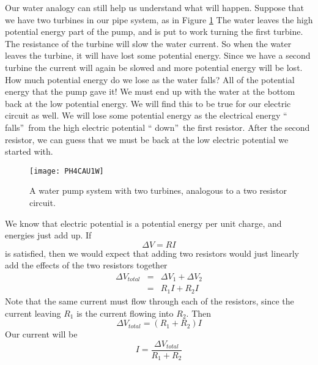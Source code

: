 Our water analogy can still help us understand what will happen. Suppose
that we have two turbines in our pipe system, as in Figure
\ref{fig:water_pump_analogy_2}
The water leaves the high
potential energy part of the pump, and is put to work turning the first
turbine. The resistance of the turbine will slow the water current. So when
the water leaves the turbine, it will have lost some potential energy. Since
we have a second turbine the current will again be slowed and more potential
energy will be lost. How much potential energy do we lose as the water
falls? All of the potential energy that the pump gave it! We must end up
with the water at the bottom back at the low potential energy. We will find
this to be true for our electric circuit as well. We will lose some
potential energy as the electrical energy \textquotedblleft
falls\textquotedblright\ from the high electric potential \textquotedblleft
down\textquotedblright\ the first resistor. After the second resistor, we
can guess that we must be back at the low electric potential we started with.
\begin{figure}[htbp!]
\centering
\texttt{[image: PH4CAU1W]}
\caption[A water pump system with two turbines]{A water pump system
with two turbines, analogous to a two resistor circuit.}
\label{fig:water_pump_analogy_2}
\end{figure}

We know that electric potential
is a potential energy per unit charge, and energies just add up. If 
\begin{equation*}
\Delta V=RI
\end{equation*}%
is satisfied, then we would expect that adding two resistors would just
linearly add the effects of the two resistors together%
\begin{eqnarray*}
\Delta V_{total} &=&\Delta V_{1}+\Delta V_{2} \\
&=&R_{1}I+R_{2}I
\end{eqnarray*}%
Note that the same current must flow through each of the resistors, since
the current leaving $R_{1}$ is the current flowing into $R_{2}.$ Then 
\begin{equation*}
\Delta V_{total}=\left( R_{1}+R_{2}\right) I
\end{equation*}%
Our current will be 
\begin{equation*}
I=\frac{\Delta V_{total}}{R_{1}+R_{2}}
\end{equation*}

